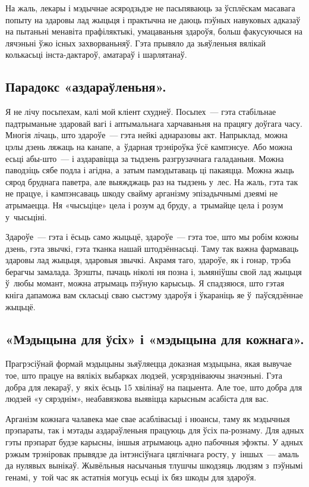 На жаль, лекары і мэдычнае асяродзьдзе не пасьпяваюць за ўсплёскам масавага попыту на здаровы лад жыцьця і практычна не даюць пэўных навуковых адказаў на пытаньні менавіта прафіляктыкі, умацаваньня здароўя, больш факусуючыся на лячэньні ўжо існых захворваньняў. Гэта прывяло да зьяўленьня вялікай колькасьці інста-дактароў, аматараў і шарлятанаў.

\subsection*{Парадокс «аздараўленьня».} 

Я не лічу посьпехам, калі мой кліент схуднеў. Посьпех~--- гэта стабільнае падтрыманьне здаровай вагі і аптымальнага харчаваньня на працягу доўгага часу. Многія лічаць, што здароўе~--- гэта нейкі аднаразовы акт. Напрыклад, можна цэлы дзень ляжаць на канапе, а~ўдарная трэніроўка ўсё кампэнсуе. Або можна есьці абы-што~--- і аздаравіцца за тыдзень разгрузачнага галаданьня. Можна паводзіць сябе подла і агідна, а~затым памэдытаваць ці пакаяцца. Можна жыць сярод бруднага паветра, але выяжджаць раз на тыдзень у~лес. На жаль, гэта так не працуе, і кампэнсаваць шкоду свайму арганізму эпізадычнымі дзеямі не атрымаецца. Ня «чысьціце» цела і розум ад бруду, а~трымайце цела і розум у~чысьціні.

Здароўе~--- гэта і ёсьць само жыцьцё, здароўе~--- гэта тое, што мы робім кожны дзень, гэта звычкі, гэта тканка нашай штодзённасьці. Таму так важна фармаваць здаровы лад жыцьця, здаровыя звычкі. Акрамя таго, здароўе, як і гонар, трэба берагчы замалада. Зрэшты, пачаць ніколі ня позна і, зьмяніўшы свой лад жыцьця ў~любы момант, можна атрымаць пэўную карысьць. Я спадзяюся, што гэтая кніга дапаможа вам скласьці сваю сыстэму здароўя і ўкараніць яе ў~паўсядзённае жыцьцё.

\subsection*{«Мэдыцына для ўсіх» і «мэдыцына для кожнага».}

Прагрэсіўнай формай мэдыцыны зьяўляецца доказная мэдыцына, якая вывучае тое, што працуе на вялікіх выбарках людзей, усярэдніваючы значэньні. Гэта добра для лекараў, у~якіх ёсьць 15 хвілінаў на пацыента. Але тое, што добра для людзей «у сярэднім», неабавязкова выявіцца карысным асабіста для вас.

Арганізм кожнага чалавека мае свае асаблівасьці і нюансы, таму як мэдычныя прэпараты, так і мэтады аздараўленьня працуюць для ўсіх па-рознаму. Для адных гэты прэпарат будзе карысны, іншыя атрымаюць адно пабочныя эфэкты. У адных рэжым трэніровак прывядзе да інтэнсіўнага цяглічнага росту, у~іншых~--- амаль да нулявых вынікаў. Жывёльныя насычаныя тлушчы шкодзяць людзям з~пэўнымі генамі, у~той час як астатнія могуць есьці іх бяз шкоды для здароўя.

